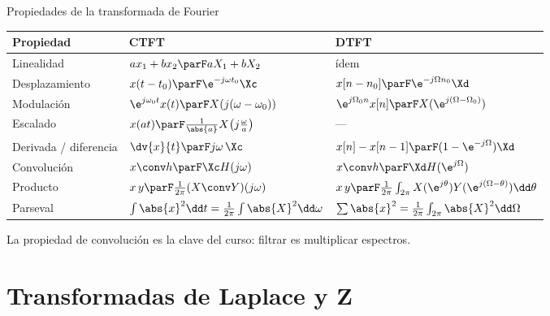 \documentclass[aspectratio=169,11pt]{beamer}
\begin{document}
\begin{frame}{Propiedades de la transformada de Fourier}
  \small
  \renewcommand{\arraystretch}{1.3}
  \begin{tabular}{@{}lll@{}}
    \toprule
    Propiedad & CTFT & DTFT\\\midrule
    Linealidad & $a x_1+b x_2\parF aX_1+bX_2$ & ídem\\
    Desplazamiento & $x(t-t_0)\parF\e^{-j\omega t_0}\Xc$ & $x[n-n_0]\parF\e^{-j\Omega n_0}\Xd$\\
    Modulación & $\e^{j\omega_0t}x(t)\parF X(j(\omega-\omega_0))$ & $\e^{j\Omega_0n}x[n]\parF X(\e^{j(\Omega-\Omega_0)})$\\
    Escalado & $x(at)\parF\frac{1}{\abs{a}}X\big(j\tfrac{\omega}{a}\big)$ & —\\
    Derivada / diferencia & $\dv{x}{t}\parF j\omega\,\Xc$ & $x[n]-x[n-1]\parF(1-\e^{-j\Omega})\Xd$\\
    \alert{Convolución} & $x\conv h\parF\Xc H(j\omega)$ & $x\conv h\parF\Xd H(\e^{j\Omega})$\\
    Producto & $x\,y\parF\frac{1}{2\pi}(X\conv Y)(j\omega)$ & $x\,y\parF\frac{1}{2\pi}\int_{2\pi}X(\e^{j\theta})Y(\e^{j(\Omega-\theta)})\dd\theta$\\
    Parseval & $\int\abs{x}^2\dd t=\frac{1}{2\pi}\int\abs{X}^2\dd\omega$ & $\sum\abs{x}^2=\frac{1}{2\pi}\int_{2\pi}\abs{X}^2\dd\Omega$\\\bottomrule
  \end{tabular}
  \bigskip

  La propiedad de \alert{convolución} es la clave del curso: filtrar es multiplicar espectros.
\end{frame}

\section{Transformadas de Laplace y Z}
\end{document}
